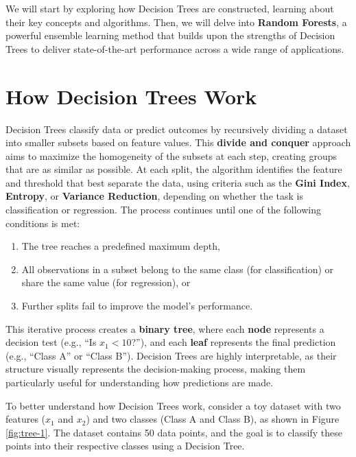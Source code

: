 \documentclass[
]{book}
\providecommand{\tightlist}{%
  \setlength{\itemsep}{0pt}\setlength{\parskip}{0pt}}
\theoremstyle{definition}
\theoremstyle{definition}
\theoremstyle{definition}
\theoremstyle{definition}
\theoremstyle{remark}
\begin{document}
We will start by exploring how Decision Trees are constructed, learning about their key concepts and algorithms. Then, we will delve into \textbf{Random Forests}, a powerful ensemble learning method that builds upon the strengths of Decision Trees to deliver state-of-the-art performance across a wide range of applications.

\section{How Decision Trees Work}\label{how-decision-trees-work}

Decision Trees classify data or predict outcomes by recursively dividing a dataset into smaller subsets based on feature values. This \textbf{divide and conquer} approach aims to maximize the homogeneity of the subsets at each step, creating groups that are as similar as possible. At each split, the algorithm identifies the feature and threshold that best separate the data, using criteria such as the \textbf{Gini Index}, \textbf{Entropy}, or \textbf{Variance Reduction}, depending on whether the task is classification or regression. The process continues until one of the following conditions is met:

\begin{enumerate}
\def\labelenumi{\arabic{enumi}.}
\tightlist
\item
  The tree reaches a predefined maximum depth,\\
\item
  All observations in a subset belong to the same class (for classification) or share the same value (for regression), or\\
\item
  Further splits fail to improve the model's performance.
\end{enumerate}

This iterative process creates a \textbf{binary tree}, where each \textbf{node} represents a decision test (e.g., ``Is \(x_1 < 10\)?''), and each \textbf{leaf} represents the final prediction (e.g., ``Class A'' or ``Class B''). Decision Trees are highly interpretable, as their structure visually represents the decision-making process, making them particularly useful for understanding how predictions are made.

To better understand how Decision Trees work, consider a toy dataset with two features (\(x_1\) and \(x_2\)) and two classes (Class A and Class B), as shown in Figure \ref{fig:tree-1}. The dataset contains 50 data points, and the goal is to classify these points into their respective classes using a Decision Tree.
\end{document}
